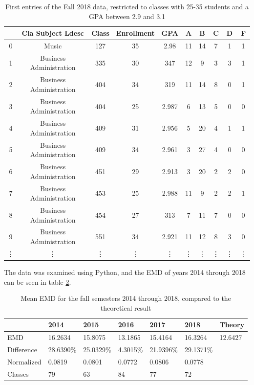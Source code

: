 \documentclass[12pt,letterpaper,oneside,openany]{book}
\begin{document}
\begin{table}[]
	\centering
	\begin{tabular}{c||ccccccccc}
		& Cla Subject Ldesc               & Class & Enrollment & GPA   & A    & B    & C   & D   & F   \\ \hline
		0  & Music                           & 127   & 35                & 2.98  & 11 & 14 & 7 & 1 & 1 \\
		1  & Business Administration         & 335   & 30                & 347 & 12 & 9  & 3 & 3 & 1 \\
		2  & Business Administration         & 404   & 34                & 319 & 11 & 14 & 8 & 0 & 1 \\
		3  & Business Administration         & 404   & 25                & 2.987 & 6  & 13 & 5 & 0 & 0 \\
		4  & Business Administration         & 409   & 31                & 2.956 & 5  & 20 & 4 & 1 & 1 \\
		5  & Business Administration         & 409   & 34                & 2.961 & 3  & 27 & 4 & 0 & 0 \\
		6  & Business Administration         & 451   & 29                & 2.913 & 3  & 20 & 2 & 2 & 0 \\
		7  & Business Administration         & 453   & 25                & 2.988 & 11 & 9  & 2 & 2 & 1 \\
		8  & Business Administration         & 454   & 27                & 313 & 7  & 11 & 7 & 0 & 0 \\
		9  & Business Administration         & 551   & 34                & 2.921 & 11 & 12 & 8 & 3 & 0 \\
		\vdots & \vdots & \vdots & \vdots & \vdots & \vdots & \vdots & \vdots & \vdots & \vdots \\
	\end{tabular}
	\caption{First entries of the Fall 2018 data, restricted to classes with 25-35 students and a GPA between 2.9 and 3.1}
	\label{tab:fall2018data}
\end{table}


The data was examined using Python, and the EMD of years 2014 through 2018 can be seen in table \ref{tab:emd_results}.

\begin{table}[]
	\centering
	\begin{tabular}{l||llllll}
		& 2014     & 2015     & 2016     & 2017     & 2018     & Theory \\ \hline
		EMD & 16.2634 & 15.8075 & 13.1865 & 15.4164 & 16.3264 & 12.6427           \\
		Difference & 28.6390\% & 25.0329\% & 4.3015\% & 21.9396\% & 29.1371\% \\
		Normalized & 0.0819 & 0.0801 & 0.0772 & 0.0806 & 0.0778 \\
		Classes & 79 & 63 & 84 & 77 & 72 
	\end{tabular}
	\caption{Mean EMD for the fall semesters 2014 through 2018, compared to the theoretical result}
	\label{tab:emd_results}
\end{table}
\end{document}
